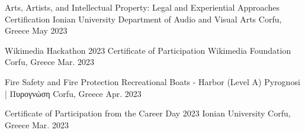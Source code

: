 


\begin{cventries}

  \cventry
    {Arts, Artists, and Intellectual Property: Legal and Experiential Approaches Certification} %
    {Ionian University Department of Audio and Visual Arts} %
    {Corfu, Greece} %
    {May 2023} %
    {
      \begin{cvitems} %
      \end{cvitems}
    }


  \cventry
    {Wikimedia Hackathon 2023 Certificate of Participation} %
    {Wikimedia Foundation} %
    {Corfu, Greece} %
    {Mar. 2023} %
    {
      \begin{cvitems} %
      \end{cvitems}
    }


  \cventry
    {Fire Safety and Fire Protection Recreational Boats - Harbor (Level A)} %
    {Pyrognosi | Πυρογνώση} %
    {Corfu, Greece} %
    {Apr. 2023} %
    {
      \begin{cvitems} %
      \end{cvitems}
    }


  \cventry
    {Certificate of Participation from the Career Day 2023} %
    {Ionian University} %
    {Corfu, Greece} %
    {Mar. 2023} %
    {
      \begin{cvitems} %
      \end{cvitems}
    }


\end{cventries}

